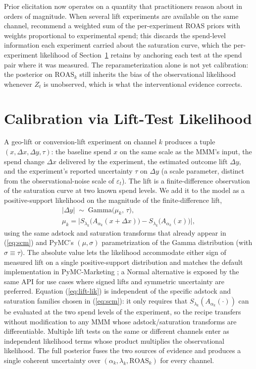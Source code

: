 \documentclass{uai2026} %
\newcommand{\ROAS}{\mathrm{ROAS}}
\begin{document}
Prior elicitation now operates on a quantity that practitioners reason about in orders of magnitude.
When several lift experiments are available on the same channel, \citet{wurm2024mmmcalibration} recommend a weighted sum of the per-experiment ROAS priors with weights proportional to experimental spend; this discards the spend-level information each experiment carried about the saturation curve, which the per-experiment likelihood of Section~\ref{sec:liftlik} retains by anchoring each test at the spend pair where it was measured.
The reparameterization alone is not yet calibration: the posterior on $\ROAS_k$ still inherits the bias of the observational likelihood whenever $Z_t$ is unobserved, which is what the interventional evidence corrects.

\section{Calibration via Lift-Test Likelihood}\label{sec:liftlik}

A geo-lift or conversion-lift experiment on channel $k$ produces a tuple $(x, \Delta x, \Delta y, \tau)$: the baseline spend $x$ on the same scale as the MMM's input, the spend change $\Delta x$ delivered by the experiment, the estimated outcome lift $\Delta y$, and the experiment's reported uncertainty $\tau$ on $\Delta y$ (a scale parameter, distinct from the observational-noise scale of $\varepsilon_t$).
The lift is a finite-difference observation of the saturation curve at two known spend levels.
We add it to the model as a positive-support likelihood on the magnitude of the finite-difference lift,
\begin{multline}\label{eq:lift-lik}
    |\Delta y| \;\sim\; \mathrm{Gamma}\bigl(\mu_k,\, \tau\bigr),\\
    \mu_k = \bigl|S_{\lambda_k}\!\bigl(A_{\alpha_k}(x + \Delta x)\bigr) - S_{\lambda_k}\!\bigl(A_{\alpha_k}(x)\bigr)\bigr|,
\end{multline}
using the same adstock and saturation transforms that already appear in (\ref{eq:scm}) and PyMC's $(\mu,\sigma)$ parametrization of the Gamma distribution (with $\sigma \equiv \tau$).
The absolute value lets the likelihood accommodate either sign of measured lift on a single positive-support distribution and matches the default implementation in PyMC-Marketing \citep{pymcmarketing_lift_test_source}; a Normal alternative is exposed by the same API for use cases where signed lifts and symmetric uncertainty are preferred.
Equation (\ref{eq:lift-lik}) is independent of the specific adstock and saturation families chosen in (\ref{eq:scm}): it only requires that $S_{\lambda_k}(A_{\alpha_k}(\cdot))$ can be evaluated at the two spend levels of the experiment, so the recipe transfers without modification to any MMM whose adstock/saturation transforms are differentiable.
Multiple lift tests on the same or different channels enter as independent likelihood terms whose product multiplies the observational likelihood.
The full posterior fuses the two sources of evidence and produces a single coherent uncertainty over $(\alpha_k, \lambda_k, \ROAS_k)$ for every channel.
\end{document}
